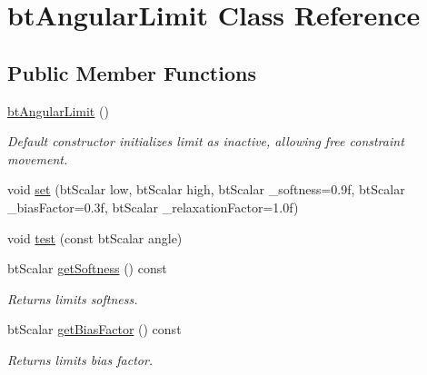 \hypertarget{classbtAngularLimit}{}\section{bt\+Angular\+Limit Class Reference}
\label{classbtAngularLimit}
\subsection*{Public Member Functions}
\begin{DoxyCompactItemize}
\item 
\mbox{\label{classbtAngularLimit_ac3364359851713e6cb32b16611e9331d}} 
\hyperlink{classbtAngularLimit_ac3364359851713e6cb32b16611e9331d}{bt\+Angular\+Limit} ()
\begin{DoxyCompactList}\small\item\em Default constructor initializes limit as inactive, allowing free constraint movement. \end{DoxyCompactList}\item 
void \hyperlink{classbtAngularLimit_aae9e0c21886c2f98f9ad1928bf024b3f}{set} (bt\+Scalar low, bt\+Scalar high, bt\+Scalar \+\_\+softness=0.\+9f, bt\+Scalar \+\_\+bias\+Factor=0.\+3f, bt\+Scalar \+\_\+relaxation\+Factor=1.\+0f)
\item 
void \hyperlink{classbtAngularLimit_aa8908e320fa18257118bbe81948142d8}{test} (const bt\+Scalar angle)
\item 
\mbox{\label{classbtAngularLimit_a53fcf2522b1988022f21e0ef2cde1b4c}} 
bt\+Scalar \hyperlink{classbtAngularLimit_a53fcf2522b1988022f21e0ef2cde1b4c}{get\+Softness} () const
\begin{DoxyCompactList}\small\item\em Returns limit\textquotesingle{}s softness. \end{DoxyCompactList}\item 
\mbox{\label{classbtAngularLimit_a2ba4c0092e8fd39cdf09113b6aedd740}} 
bt\+Scalar \hyperlink{classbtAngularLimit_a2ba4c0092e8fd39cdf09113b6aedd740}{get\+Bias\+Factor} () const
\begin{DoxyCompactList}\small\item\em Returns limit\textquotesingle{}s bias factor. \end{DoxyCompactList}\item 

\end{DoxyCompactItemize}
